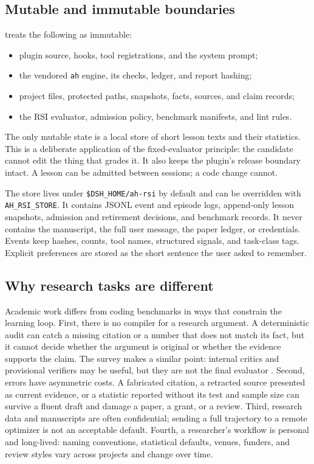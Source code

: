 \subsection{Mutable and immutable boundaries}
\label{sec:boundaries}
\system{} treats the following as immutable:
\begin{itemize}[leftmargin=1.4em,itemsep=2pt]
  \item plugin source, hooks, tool registrations, and the system prompt;
  \item the vendored \texttt{ah} engine, its checks, ledger, and report hashing;
  \item project files, protected paths, snapshots, facts, sources, and claim records;
  \item the RSI evaluator, admission policy, benchmark manifests, and lint rules.
\end{itemize}
The only mutable state is a local store of short lesson texts and their statistics. This is a deliberate application of the fixed-evaluator principle: the candidate cannot edit the thing that grades it. It also keeps the plugin's release boundary intact. A lesson can be admitted between sessions; a code change cannot.

The store lives under \texttt{\$DSH\_HOME/ah-rsi} by default and can be overridden with \texttt{AH\_RSI\_STORE}. It contains JSONL event and episode logs, append-only lesson snapshots, admission and retirement decisions, and benchmark records. It never contains the manuscript, the full user message, the paper ledger, or credentials. Events keep hashes, counts, tool names, structured signals, and task-class tags. Explicit preferences are stored as the short sentence the user asked to remember.

\subsection{Why research tasks are different}
Academic work differs from coding benchmarks in ways that constrain the learning loop. First, there is no compiler for a research argument. A deterministic audit can catch a missing citation or a number that does not match its fact, but it cannot decide whether the argument is original or whether the evidence supports the claim. The survey makes a similar point: internal critics and provisional verifiers may be useful, but they are not the final evaluator \citep{wei2026harnessrsi}. Second, errors have asymmetric costs. A fabricated citation, a retracted source presented as current evidence, or a statistic reported without its test and sample size can survive a fluent draft and damage a paper, a grant, or a review. Third, research data and manuscripts are often confidential; sending a full trajectory to a remote optimizer is not an acceptable default. Fourth, a researcher's workflow is personal and long-lived: naming conventions, statistical defaults, venues, funders, and review styles vary across projects and change over time.

